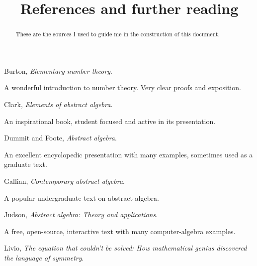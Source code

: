 \documentclass{ximera}
\title{References and further reading}
\begin{document}
\begin{abstract}
  These are the sources I used to guide me in the construction of this
  document.
\end{abstract}
\maketitle

\vspace{-1in}

\begin{thebibliography}{MMMM2002}

 Burton, \textit{Elementary number theory}.
  
  \begin{annotate}
    A wonderful introduction to number theory. Very clear proofs and
    exposition.
  \end{annotate}

  

 Clark, \textit{Elements of abstract algebra}.
  
  \begin{annotate}
    An inspirational book, student focused and active in its
    presentation.
  \end{annotate}
   
  
 Dummit and Foote, \textit{Abstract algebra}.

  \begin{annotate}
    An excellent encyclopedic presentation with many examples,
    sometimes used as a graduate text.
  \end{annotate}

 Gallian, \textit{Contemporary abstract algebra}.

  \begin{annotate}
    A popular undergraduate text on abstract algebra.
  \end{annotate}
   
 Judson, \textit{Abstract algebra: Theory and applications}.

  \begin{annotate}
    A free, open-source, interactive text with many computer-algebra
    examples.
  \end{annotate}


 Livio, \textit{The equation that couldn't be solved:
  How mathematical genius discovered the language of symmetry}.


\end{thebibliography}
\end{document}
